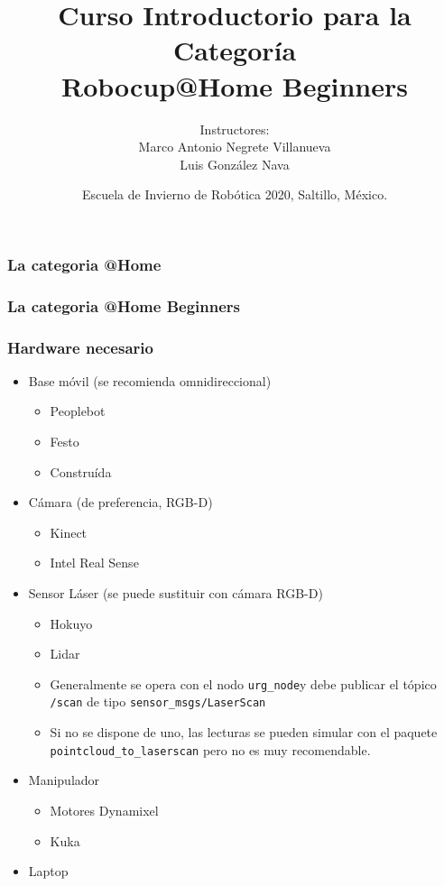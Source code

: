 \documentclass[10pt,spanish,aspectratio=1610]{beamer}
\begin{document}
\renewcommand{\tablename}{Tabla}
\renewcommand{\figurename}{Figura}

\title[Robocup@Home Beginners]{Curso Introductorio para la Categoría\\Robocup@Home Beginners}
\author[Marco Negrete y Luis González]{Instructores: \\ Marco Antonio Negrete Villanueva \\ Luis González Nava}
\date[EIR 2020]{Escuela de Invierno de Robótica 2020, Saltillo, México.}

\begin{frame}
\titlepage
\end{frame}

\begin{frame}\frametitle{La categoria @Home}
  
\end{frame}

\begin{frame}\frametitle{La categoria @Home Beginners}
  
\end{frame}

\begin{frame}\frametitle{Hardware necesario}
  \begin{itemize}
  \item Base móvil (se recomienda omnidireccional)
    \begin{itemize}
    \item Peoplebot
    \item Festo
    \item Construída
    \end{itemize}
  \item Cámara (de preferencia, RGB-D)
    \begin{itemize}
    \item Kinect
    \item Intel Real Sense
    \end{itemize}
  \item Sensor Láser (se puede sustituir con cámara RGB-D)
    \begin{itemize}
    \item Hokuyo
    \item Lidar
    \item Generalmente se opera con el nodo \texttt{urg\_node}y debe publicar el tópico \texttt{/scan} de tipo \texttt{sensor\_msgs/LaserScan}
    \item Si no se dispone de uno, las lecturas se pueden simular con el paquete \texttt{pointcloud\_to\_laserscan} pero no es muy recomendable.
    \end{itemize}
  \item Manipulador
    \begin{itemize}
    \item Motores Dynamixel
    \item Kuka
    \end{itemize}
  \item Laptop
  \end{itemize}
\end{frame}
\end{document}
